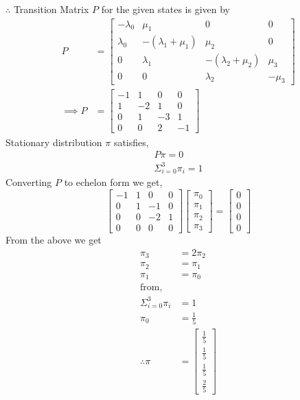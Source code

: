 \documentclass[journal,12pt,twocolumn]{IEEEtran}
\theoremstyle{remark}
\begin{document}
$\therefore$ Transition Matrix $P$ for the given states is given by 
\begin{equation}
\label{eq:62.3}
\begin{split}
P &= \begin{bmatrix}
-\lambda_0 & \mu_1 & 0 & 0 \\
\lambda_0 & -(\lambda_1 + \mu_1) & \mu_2 & 0 \\
0 & \lambda_1 & -(\lambda_2 + \mu_2) & \mu_3\\
0 & 0 & \lambda_2 & -\mu_3
\end{bmatrix}\\
\implies 
P &= \begin{bmatrix}
-1 & 1 & 0 & 0 \\
1 & -2 & 1 & 0 \\
0 & 1 & -3 & 1\\
0 & 0 & 2 & -1
\end{bmatrix}
\end{split}
\end{equation}
Stationary distribution $\pi$ satisfies,
\begin{equation}
\begin{split}
\label{eq:62.4}
P\pi = 0\\
\Sigma_{i=0}^{3}\pi_i = 1
\end{split}
\end{equation}
Converting $P$ to echelon form we get,
\begin{equation}
\label{eq:62.5}
\begin{bmatrix}
-1 & 1 & 0 & 0 \\
0 & 1 & -1 & 0 \\
0 & 0 & -2 & 1\\
0 & 0 & 0 & 0
\end{bmatrix}
\begin{bmatrix}
\pi_0\\
\pi_1\\
\pi_2\\
\pi_3
\end{bmatrix} =
\begin{bmatrix}
0\\
0\\
0\\
0
\end{bmatrix}
\end{equation}
From the above we get
\begin{equation}
\label{eq:62.6}
\begin{split}
\pi_3 & = 2\pi_2\\
\pi_2 &= \pi_1\\
\pi_1 &= \pi_0\\
\text{from, } \\
\Sigma_{i=0}^{3}\pi_i &= 1\\
\pi_0 &= \frac{1}{5}\\
\therefore
\pi &= \begin{bmatrix}
\frac{1}{5}\\
\frac{1}{5}\\
\frac{1}{5}\\
\frac{2}{5}
\end{bmatrix}
\end{split}
\end{equation}
\end{document}
